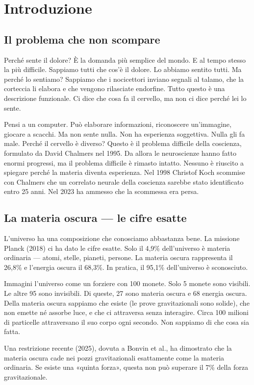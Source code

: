 \section{Introduzione}

\subsection{Il problema che non scompare}
Perché sente il dolore? È la domanda più semplice del mondo. E al tempo stesso la più difficile. Sappiamo tutti che cos'è il dolore. Lo abbiamo sentito tutti. Ma perché lo sentiamo? Sappiamo che i nocicettori inviano segnali al talamo, che la corteccia li elabora e che vengono rilasciate endorfine. Tutto questo è una descrizione funzionale. Ci dice che cosa fa il cervello, ma non ci dice perché lei lo sente.

Pensi a un computer. Può elaborare informazioni, riconoscere un'immagine, giocare a scacchi. Ma non sente nulla. Non ha esperienza soggettiva. Nulla gli fa male. Perché il cervello è diverso? Questo è il problema difficile della coscienza, formulato da David Chalmers nel 1995. Da allora le neuroscienze hanno fatto enormi progressi, ma il problema difficile è rimasto intatto. Nessuno è riuscito a spiegare perché la materia diventa esperienza. Nel 1998 Christof Koch scommise con Chalmers che un correlato neurale della coscienza sarebbe stato identificato entro 25 anni. Nel 2023 ha ammesso che la scommessa era persa.

\subsection{La materia oscura --- le cifre esatte}
L'universo ha una composizione che conosciamo abbastanza bene. La missione Planck (2018) ci ha dato le cifre esatte. Solo il 4,9\% dell'universo è materia ordinaria --- atomi, stelle, pianeti, persone. La materia oscura rappresenta il 26,8\% e l'energia oscura il 68,3\%. In pratica, il 95,1\% dell'universo è sconosciuto.

Immagini l'universo come un forziere con 100 monete. Solo 5 monete sono visibili. Le altre 95 sono invisibili. Di queste, 27 sono materia oscura e 68 energia oscura. Della materia oscura sappiamo che esiste (le prove gravitazionali sono solide), che non emette né assorbe luce, e che ci attraversa senza interagire. Circa 100 milioni di particelle attraversano il suo corpo ogni secondo. Non sappiamo di che cosa sia fatta.

Una restrizione recente (2025), dovuta a Bonvin et al., ha dimostrato che la materia oscura cade nei pozzi gravitazionali esattamente come la materia ordinaria. Se esiste una «quinta forza», questa non può superare il 7\% della forza gravitazionale.

